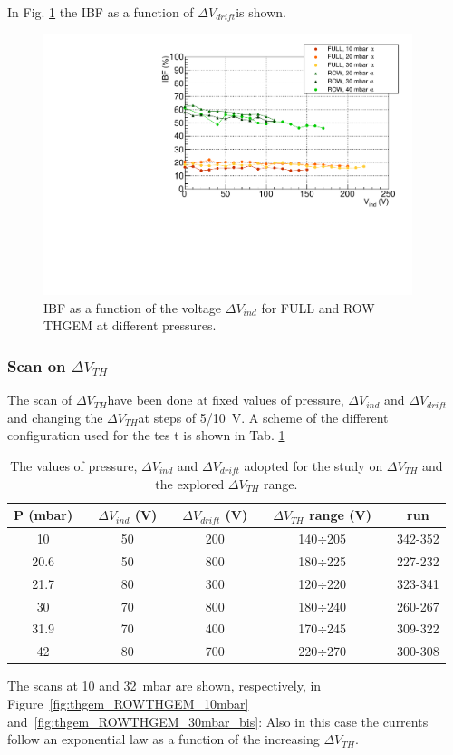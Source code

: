 \documentclass[a4paper, 11 pt]{report}
\newcommand{\Vind}{$\Delta V_{ind}$}
\newcommand{\Vthgem}{$\Delta V_{TH}$}
\newcommand{\Vdrift}{$ \Delta V_{drift}$}
\begin{document}
In Fig. \ref{fig:IBF_ALL_induction} the IBF as a function of \Vdrift is shown.
\begin{figure}[!htb]
	\centering
    \includegraphics[width=0.96\textwidth]{Immagini/IBF_ALL_induction.pdf}
	\caption{IBF as a function of the voltage \Vind{} for FULL and ROW THGEM at different pressures.}
	\label{fig:IBF_ALL_induction}
\end{figure}




\subsubsection{Scan on \Vthgem}
The scan of \Vthgem have been done at fixed values of pressure, \Vind{} and \Vdrift{} and 
changing the \Vthgem at steps of 5/10~V.
A scheme of the different configuration used for the tes t is shown in Tab. \ref{tab:ROWTHGEM_vthgem}

\begin{table} [htbp]
	\begin{center}
		\renewcommand{\arraystretch}{1.2}
		\begin{tabular} {ccccccccc}
			P (mbar) & & \Vind{} (V) & & \Vdrift{} (V) & & \Vthgem{} range (V) & & run\\
			\toprule[0.1em]
			10		& & 50	& & 200	& & 140$\div$205 & & 342-352\\
			20.6	& &	50	& &	800 & & 180$\div$225 & & 227-232\\
			21.7	& & 80	& & 300	& & 120$\div$220 & & 323-341\\
			30		& &	70	& & 800 & & 180$\div$240 & & 260-267\\
			31.9	& & 70	& &	400	& & 170$\div$245 & & 309-322\\
			42		& & 80	& & 700 & & 220$\div$270 & & 300-308\\
			\bottomrule[0.1em]
		\end{tabular}
	\end{center}
	\caption{The values of pressure, \Vind{} and \Vdrift{} adopted for the study on \Vthgem{} and the 
	explored \Vthgem{} range.} \label{tab:ROWTHGEM_vthgem}
\end{table}
The scans at 10 and 32~mbar are shown, respectively, in Figure~\ref{fig:thgem_ROWTHGEM_10mbar} 
and~\ref{fig:thgem_ROWTHGEM_30mbar_bis}: Also in this case the currents follow an exponential law 
as a function of the increasing \Vthgem.
 
\end{document}
